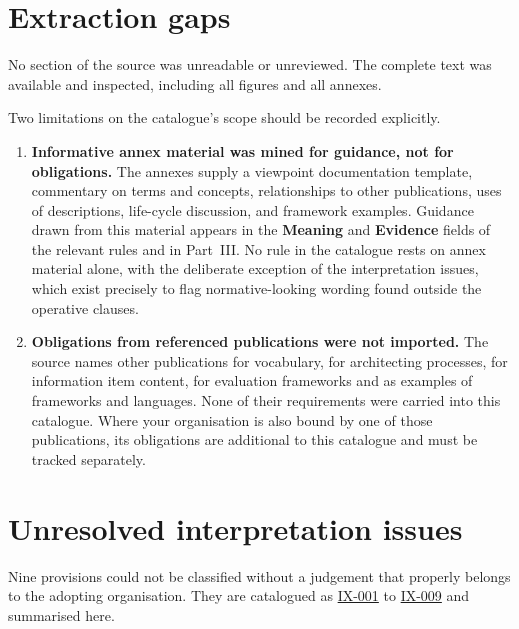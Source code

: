 \documentclass[11pt,a4paper]{report}
\newcommand{\rref}[1]{\hyperref[rule:#1]{\textsf{\small #1}}}
\begin{document}
\section{Extraction gaps}

No section of the source was unreadable or unreviewed. The complete text was
available and inspected, including all figures and all annexes.

Two limitations on the catalogue's scope should be recorded explicitly.

\begin{enumerate}
  \item \textbf{Informative annex material was mined for guidance, not for
        obligations.} The annexes supply a viewpoint documentation template,
        commentary on terms and concepts, relationships to other publications,
        uses of descriptions, life-cycle discussion, and framework examples.
        Guidance drawn from this material appears in the \textbf{Meaning} and
        \textbf{Evidence} fields of the relevant rules and in Part~III. No rule
        in the catalogue rests on annex material alone, with the deliberate
        exception of the interpretation issues, which exist precisely to flag
        normative-looking wording found outside the operative clauses.
  \item \textbf{Obligations from referenced publications were not imported.}
        The source names other publications for vocabulary, for architecting
        processes, for information item content, for evaluation frameworks and
        as examples of frameworks and languages. None of their requirements were
        carried into this catalogue. Where your organisation is also bound by
        one of those publications, its obligations are additional to this
        catalogue and must be tracked separately.
\end{enumerate}

\section{Unresolved interpretation issues}

Nine provisions could not be classified without a judgement that properly
belongs to the adopting organisation. They are catalogued as
\rref{IX-001} to \rref{IX-009} and summarised
here.
\end{document}
